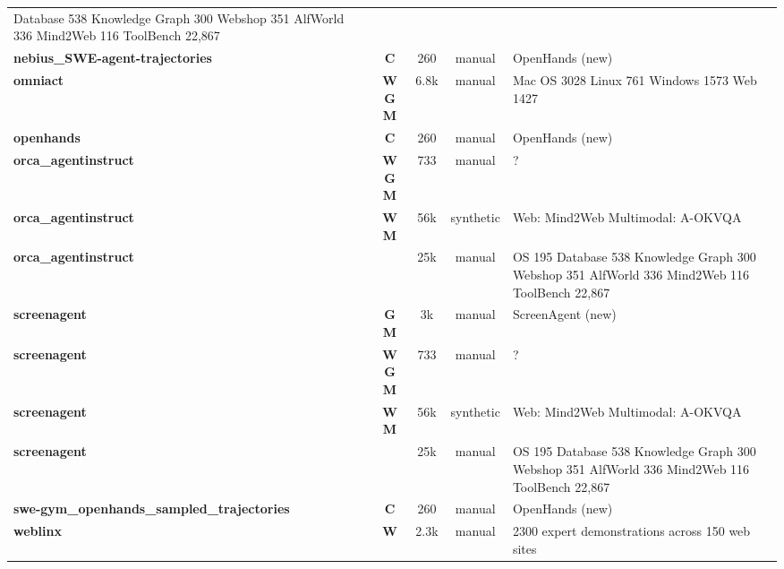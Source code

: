 \begin{table}[t]
\begin{tabular*}{\textwidth}{@{\extracolsep{\fill}}l c c c p{5cm}}
Database 538
Knowledge Graph 300
Webshop 351
AlfWorld 336
Mind2Web 116
ToolBench 22,867 \\
        \textbf{nebius\_SWE-agent-trajectories} & \textbf{C} & 260 & manual & OpenHands (new) \\
        \textbf{omniact \cite{omniact_a_dataset_an_2402_17553}} & \textbf{W} \textbf{G} \textbf{M} & 6.8k & manual & Mac OS 3028
Linux 761
Windows 1573
Web 1427 \\
        \textbf{openhands} & \textbf{C} & 260 & manual & OpenHands (new) \\
        \textbf{orca\_agentinstruct \cite{webvoyager_building__2401_13919}} & \textbf{W} \textbf{G} \textbf{M} & 733 & manual & ? \\
        \textbf{orca\_agentinstruct \cite{agent_lumos_unified__2311_05657}} & \textbf{W} \textbf{M} & 56k & synthetic & Web: Mind2Web
Multimodal: A-OKVQA \\
        \textbf{orca\_agentinstruct \cite{agent_flan_designing_2403_12881}} &  & 25k & manual & OS 195
Database 538
Knowledge Graph 300
Webshop 351
AlfWorld 336
Mind2Web 116
ToolBench 22,867 \\
        \textbf{screenagent \cite{screenagent_a_vision_2402_07945}} & \textbf{G} \textbf{M} & 3k & manual & ScreenAgent (new) \\
        \textbf{screenagent \cite{webvoyager_building__2401_13919}} & \textbf{W} \textbf{G} \textbf{M} & 733 & manual & ? \\
        \textbf{screenagent \cite{agent_lumos_unified__2311_05657}} & \textbf{W} \textbf{M} & 56k & synthetic & Web: Mind2Web
Multimodal: A-OKVQA \\
        \textbf{screenagent \cite{agent_flan_designing_2403_12881}} &  & 25k & manual & OS 195
Database 538
Knowledge Graph 300
Webshop 351
AlfWorld 336
Mind2Web 116
ToolBench 22,867 \\
        \textbf{swe-gym\_openhands\_sampled\_trajectories} & \textbf{C} & 260 & manual & OpenHands (new) \\
        \textbf{weblinx \cite{weblinx_real_world_w_2402_05930}} & \textbf{W} & 2.3k & manual & 2300 expert demonstrations across 150 web sites \\
        \bottomrule
    \end{tabular*}
    \label{tab:agent_datasets}
\end{table}

